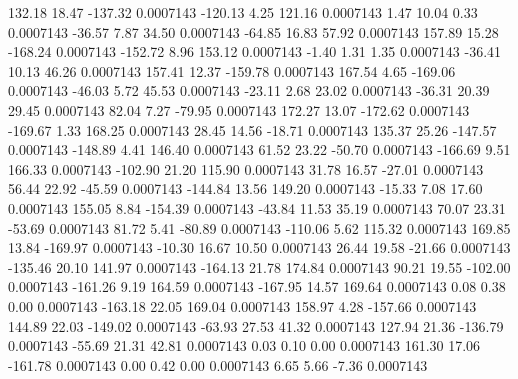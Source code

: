       132.18       18.47     -137.32     0.0007143
     -120.13        4.25      121.16     0.0007143
        1.47       10.04        0.33     0.0007143
      -36.57        7.87       34.50     0.0007143
      -64.85       16.83       57.92     0.0007143
      157.89       15.28     -168.24     0.0007143
     -152.72        8.96      153.12     0.0007143
       -1.40        1.31        1.35     0.0007143
      -36.41       10.13       46.26     0.0007143
      157.41       12.37     -159.78     0.0007143
      167.54        4.65     -169.06     0.0007143
      -46.03        5.72       45.53     0.0007143
      -23.11        2.68       23.02     0.0007143
      -36.31       20.39       29.45     0.0007143
       82.04        7.27      -79.95     0.0007143
      172.27       13.07     -172.62     0.0007143
     -169.67        1.33      168.25     0.0007143
       28.45       14.56      -18.71     0.0007143
      135.37       25.26     -147.57     0.0007143
     -148.89        4.41      146.40     0.0007143
       61.52       23.22      -50.70     0.0007143
     -166.69        9.51      166.33     0.0007143
     -102.90       21.20      115.90     0.0007143
       31.78       16.57      -27.01     0.0007143
       56.44       22.92      -45.59     0.0007143
     -144.84       13.56      149.20     0.0007143
      -15.33        7.08       17.60     0.0007143
      155.05        8.84     -154.39     0.0007143
      -43.84       11.53       35.19     0.0007143
       70.07       23.31      -53.69     0.0007143
       81.72        5.41      -80.89     0.0007143
     -110.06        5.62      115.32     0.0007143
      169.85       13.84     -169.97     0.0007143
      -10.30       16.67       10.50     0.0007143
       26.44       19.58      -21.66     0.0007143
     -135.46       20.10      141.97     0.0007143
     -164.13       21.78      174.84     0.0007143
       90.21       19.55     -102.00     0.0007143
     -161.26        9.19      164.59     0.0007143
     -167.95       14.57      169.64     0.0007143
        0.08        0.38        0.00     0.0007143
     -163.18       22.05      169.04     0.0007143
      158.97        4.28     -157.66     0.0007143
      144.89       22.03     -149.02     0.0007143
      -63.93       27.53       41.32     0.0007143
      127.94       21.36     -136.79     0.0007143
      -55.69       21.31       42.81     0.0007143
        0.03        0.10        0.00     0.0007143
      161.30       17.06     -161.78     0.0007143
        0.00        0.42        0.00     0.0007143
        6.65        5.66       -7.36     0.0007143
